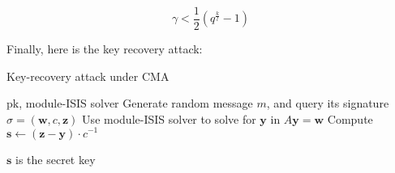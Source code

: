 \documentclass{article}
\begin{document}
$$
\gamma < \frac{1}{2}(q^\frac{k}{l} - 1)
$$

Finally, here is the key recovery attack:

\begin{algorithm}
    \caption{Key-recovery attack under CMA}
    \begin{algorithmic}[1]
        \Require $\text{pk}$, module-ISIS solver
        \State Generate random message $m$, and query its signature $\sigma = (\mathbf{w}, c, \mathbf{z})$
        \State Use module-ISIS solver to solve for $\mathbf{y}$ in $A\mathbf{y} = \mathbf{w}$
        \State Compute $\mathbf{s} \leftarrow (\mathbf{z} - \mathbf{y}) \cdot c^{-1}$

    
        \Return $\mathbf{s}$ is the secret key
    \end{algorithmic}
\end{algorithm}
\end{document}
